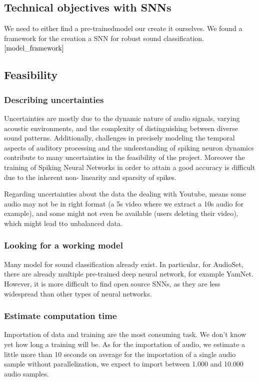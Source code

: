 \documentclass[11pt]{article}
\begin{document}
\subsection{Technical objectives with SNNs}

We need to either find a pre-trainedmodel our create it ourselves. We found a framework for the creation a SNN for robust sound classification.${\cite{model_framework}}$


\subsection{Feasibility}
\subsubsection{Describing uncertainties}
Uncertainties are mostly due to the dynamic nature of audio signals, varying acoustic environments, and the complexity of distinguishing between diverse sound patterns. Additionally, challenges in precisely modeling the temporal aspects of auditory processing and the understanding of spiking neuron dynamics contribute to many uncertainties in the feasibility of the project. Moreover the training of Spiking Neural Networks in order to attain a good accuracy is difficult due to the inherent non- linearity and sparsity of spikes.

Regarding uncertainties about the data the dealing with Youtube, means some audio may not be in right format (a 5s video where we extract a 10s audio for example), and some might not even be available (users deleting their video), which might lead tto unbalanced data.


\subsubsection{Looking for a working model}

Many model for sound classification already exist. In particular, for AudioSet, there are already multiple pre-trained deep neural network, for example YamNet. However, it is more difficult to find open source SNNs, as they are less widespread than other types of neural networks.

\subsubsection{Estimate computation time}

Importation of data and training are the most consuming task. We don't know yet how long a training will be. As for the importation of audio, we estimate a little more than 10 seconds on average for the importation of a single audio sample without parallelization, we expect to import between 1.000 and 10.000 audio samples.
\end{document}
